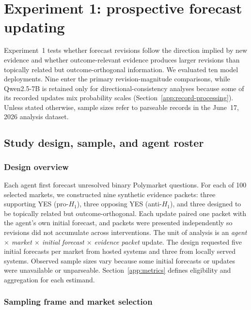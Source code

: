 \clearpage

\section{Experiment 1: prospective forecast updating}
\label{app:exp1}

Experiment~1 tests whether forecast revisions follow the direction implied by new evidence and whether outcome-relevant evidence produces larger revisions than topically related but outcome-orthogonal information.
We evaluated ten model deployments.
Nine enter the primary revision-magnitude comparisons, while Qwen2.5-7B is retained only for directional-consistency analyses because some of its recorded updates mix probability scales (Section~\ref{app:record-processing}).
Unless stated otherwise, sample sizes refer to parseable records in the June~17, 2026 analysis dataset.

\subsection{Study design, sample, and agent roster}
\label{app:exp1-sample}

\subsubsection{Design overview}

Each agent first forecast unresolved binary Polymarket questions.
For each of 100 selected markets, we constructed nine synthetic evidence packets: three supporting YES (pro-$H_1$), three opposing YES (anti-$H_1$), and three designed to be topically related but outcome-orthogonal.
Each update paired one packet with the agent's own initial forecast, and packets were presented independently so revisions did not accumulate across interventions.
The unit of analysis is an \emph{agent $\times$ market $\times$ initial forecast $\times$ evidence packet} update.
The design requested five initial forecasts per market from hosted systems and three from locally served systems.
Observed sample sizes vary because some initial forecasts or updates were unavailable or unparseable.
Section~\ref{app:metrics} defines eligibility and aggregation for each estimand.

\subsubsection{Sampling frame and market selection}
\label{app:market-selection}

